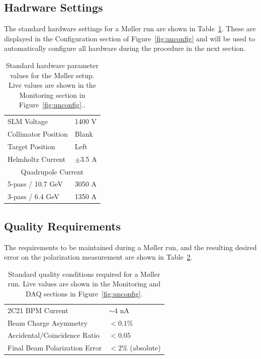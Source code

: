 \documentclass[amsmath,amssymb,notitlepage,12pt]{revtex4}
\begin{document}
\subsection{Hadrware Settings}
The standard hardware settings for a M{\o}ller run are shown in Table~\ref{tab:pars}.  These are displayed in the Configuration section of Figure~\ref{fig:unconfig} and will be used to automatically configure all hardware during the procedure in the next section.

\begin{table}[htbp]\centering
    \begin{tabular}{ll}\toprule[1.5pt]
        SLM Voltage & 1400 V \\
        Collimator Position & Blank \\
        Target Position & Left \\
        Helmholtz Current & $\pm$3.5 A \\
        \cmidrule[0.5pt]{1-2}
        \multicolumn{2}{c}{Quadrupole Current} \\
        5-pass / 10.7 GeV & 3050 A\\
        3-pass / 6.4 GeV & 1350 A\\
        \bottomrule[1.5pt]
    \end{tabular}
    \caption{Standard hardware parameter values for the M{\o}ller setup.  Live values are shown in the Monitoring section in Figure~\ref{fig:unconfig}.\label{tab:pars}.}
\end{table}

\subsection{Quality Requirements}
The requirements to be maintained during a M{\o}ller run, and the resulting desired error on the polarization measurement are shown in Table~\ref{tab:reqs}.
\begin{table}[htbp]\centering
    \begin{tabular}{ll}\toprule[1.5pt]
        2C21 BPM Current & $\sim$4 nA\\
        Beam Charge Asymmetry & $<0.1\%$\\
        Accidental/Coincidence Ratio & $<0.05$ \\
        Final Beam Polarization Error & $<2\%$ (absolute)\\
        \bottomrule[1.5pt]
    \end{tabular}
    \caption{Standard quality conditions required for a M{\o}ller run.  Live values are shown in the Monitoring and DAQ sections in Figure~\ref{fig:unconfig}.\label{tab:reqs}}
\end{table}
\end{document}
